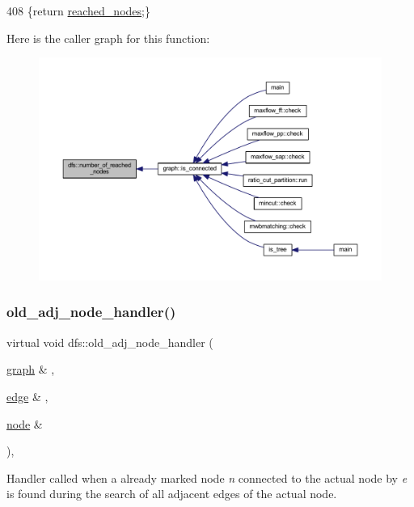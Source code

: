 \begin{DoxyCode}
408     \{\textcolor{keywordflow}{return} \mbox{\hyperlink{classdfs_acb11186a1a2a2a1f38cdc0674340ba37}{reached\_nodes}};\}
\end{DoxyCode}
Here is the caller graph for this function\+:
\nopagebreak
\begin{figure}[H]
\begin{center}
\leavevmode
\includegraphics[width=350pt]{classdfs_ae8849a552721ad4af5d9a81c6da35822_icgraph}
\end{center}
\end{figure}
\mbox{\label{classdfs_a33d1d2caa38dd038e03fa4041f5b9521}} 
\subsubsection{\texorpdfstring{old\+\_\+adj\+\_\+node\+\_\+handler()}{old\_adj\_node\_handler()}}
{\footnotesize\ttfamily virtual void dfs\+::old\+\_\+adj\+\_\+node\+\_\+handler (\begin{DoxyParamCaption}\item[{\mbox{\hyperlink{classgraph}{graph}} \&}]{,  }\item[{\mbox{\hyperlink{classedge}{edge}} \&}]{,  }\item[{\mbox{\hyperlink{classnode}{node}} \&}]{ }\end{DoxyParamCaption})\hspace{0.3cm}{\ttfamily [inline]}, {\ttfamily [virtual]}}



Handler called when a already marked node {\itshape n} connected to the actual node by {\itshape e} is found during the search of all adjacent edges of the actual node. 


